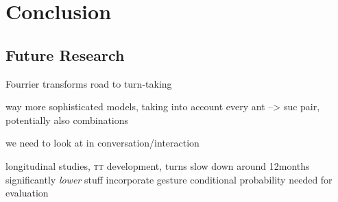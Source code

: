 
\chapter{Conclusion}
\label{ch:con}
\section{Future Research}
\label{sec:confut}
Fourrier transforms
road to turn-taking

way more sophisticated models, taking into account every ant --> suc pair, potentially also combinations

we need to look at \rt in conversation/interaction

longitudinal studies, \textsc{tt} development, turns slow down around 12months \citep{hilbrink_early_2015}
significantly \emph{lower} stuff
incorporate gesture
conditional probability needed for evaluation